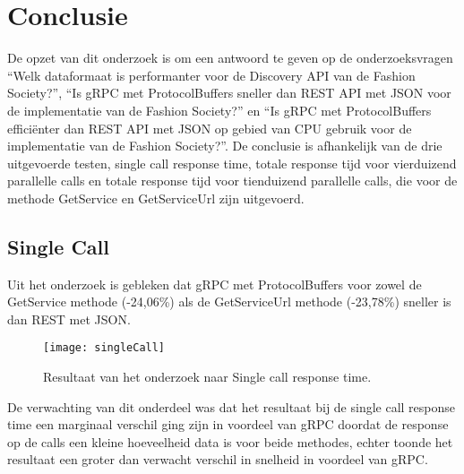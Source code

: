 
\chapter{Conclusie}
\label{ch:conclusie}


De opzet van dit onderzoek is om een antwoord te geven op de onderzoeksvragen “Welk dataformaat is performanter voor de Discovery API van de Fashion Society?”, “Is gRPC met ProtocolBuffers sneller dan REST API met JSON voor de implementatie van de Fashion Society?” en “Is gRPC met ProtocolBuffers efficiënter dan REST API met JSON op gebied van CPU gebruik voor de implementatie van de Fashion Society?”.
De conclusie is afhankelijk van de drie uitgevoerde testen, single call response time, totale response tijd voor vierduizend parallelle calls en totale response tijd voor tienduizend parallelle calls, die voor de methode GetService en GetServiceUrl zijn uitgevoerd.

\section{Single Call}
\label{sec:Single Call}
Uit het onderzoek is gebleken dat gRPC met ProtocolBuffers voor zowel de GetService methode (-24,06\%) als de GetServiceUrl methode (-23,78\%) sneller is dan REST met JSON.
\begin{figure}[H]
    \centering
    \texttt{[image: singleCall]}
    \caption[Single Call Response Time]{Resultaat van het onderzoek naar Single call response time.}
    \label{fig:SingleCallResult}
\end{figure}

De verwachting van dit onderdeel was dat het resultaat bij de single call response time een marginaal verschil ging zijn in voordeel van gRPC doordat de response op de calls een kleine hoeveelheid data is voor beide methodes, echter toonde het resultaat een groter dan verwacht verschil in snelheid in voordeel  van gRPC.

